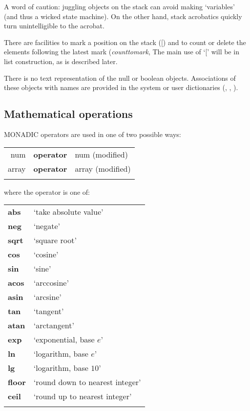 A word of caution: juggling objects on the stack can avoid making `variables' (and thus a wicked state machine). On the other hand, stack acrobatics quickly turn unintelligible to the acrobat. 

There are facilities to mark a position on the stack ([) and to count  or delete the elements following the latest mark (\emph{counttomark}, The main use of `[' will be in list construction, as is described later.

There is no text representation of the null or boolean
objects. Associations of these objects with names are provided in the
system or user dictionaries (, , ).

\subsection{Mathematical operations}\label{ssec:mathops}

MONADIC operators are used in one of two possible ways:

\begin{tabular}{>{\sffamily}r>{\sffamily\bfseries}l>{\sffamily}l} 
num & operator & num (modified)\\
array & operator & array (modified)\\\\
\end{tabular}

\noindent where the operator is one of:

\begin{supertabular}{>{\sffamily\bfseries}l>{\normalfont}l}
abs   & `take absolute value'\\
neg   & `negate'\\
sqrt  & `square root'\\
cos   & `cosine'\\
sin   & `sine'\\
acos  & `arccosine'\\
asin  & `arcsine'\\
tan   & `tangent'\\
atan  & `arctangent'\\
exp   & `exponential, base $e$'\\
ln    & `logarithm, base $e$'\\
lg    & `logarithm, base $10$'\\
floor & `round down to nearest integer'\\
ceil  & `round up to nearest integer'\\\\
\end{supertabular}

